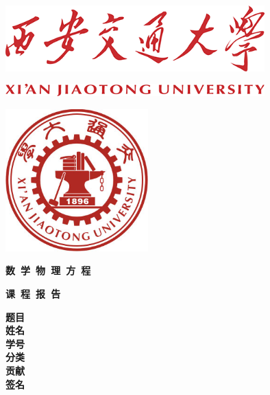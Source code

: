 {
  \setlength{\parindent}{0em}

  {
    \linespread{1}

    \vspace*{-1em}

    \begin{center}
        \includegraphics[width=100mm]{Images/ScoolName.png}
    \end{center}
    \begin{center}
        \includegraphics[width=100mm]{Images/ScoolName_E.png}
    \end{center}
    \vspace{1em}

    \begin{center}
      \includegraphics[width=55mm]{Images/SchoolEmblem.jpg}
    \end{center}
    
    \vspace{-1em}

    {
      \songti\erhao\bfseries
      \centering
      数~学~物~理~方~程\par
    }
    \vspace{1em}
    {
      \songti\sanhao\bfseries
      \centering
      课~程~报~告\par
    }

  }

  \vspace{6em}

  {
    \linespread{1.6}
    \songti\sanhao\bfseries
    \centering
    \newlength{\titlelength}
    \setlength{\titlelength}{22em}
    题目 \; \underline{} \\
    姓名 \; \underline{} \\
    学号 \; \underline{} \\
    分类 \; \underline{} \\
    贡献 \; \underline{\makebox[\titlelength ]{100\textpercent}} \\
    签名 \; \underline{}\par
  }
}